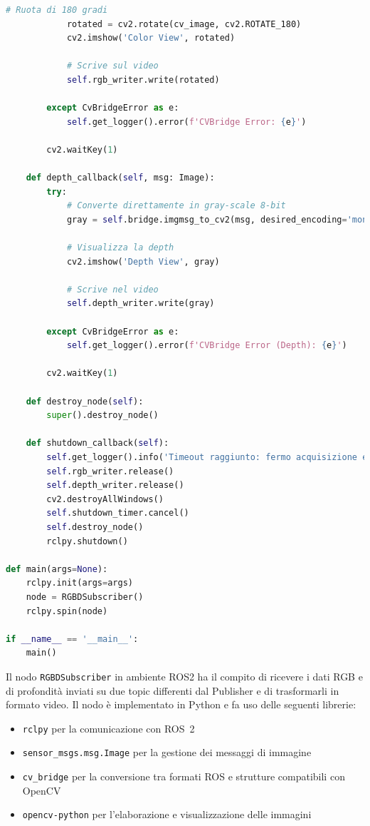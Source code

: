 \documentclass[11pt]{report}
\begin{document}
\begin{lstlisting}[language=Python, caption=Subscriber RGB-D ROS2 con salvataggio video, label=lst:rgbd_subscriber]
            # Ruota di 180 gradi
            rotated = cv2.rotate(cv_image, cv2.ROTATE_180)
            cv2.imshow('Color View', rotated)

            # Scrive sul video
            self.rgb_writer.write(rotated)

        except CvBridgeError as e:
            self.get_logger().error(f'CVBridge Error: {e}')
        
        cv2.waitKey(1)

    def depth_callback(self, msg: Image):
        try:
            # Converte direttamente in gray-scale 8-bit
            gray = self.bridge.imgmsg_to_cv2(msg, desired_encoding='mono8')

            # Visualizza la depth
            cv2.imshow('Depth View', gray)

            # Scrive nel video
            self.depth_writer.write(gray)

        except CvBridgeError as e:
            self.get_logger().error(f'CVBridge Error (Depth): {e}')

        cv2.waitKey(1)

    def destroy_node(self):
        super().destroy_node()

    def shutdown_callback(self):
        self.get_logger().info('Timeout raggiunto: fermo acquisizione e chiudo finestre.')
        self.rgb_writer.release()
        self.depth_writer.release()
        cv2.destroyAllWindows()
        self.shutdown_timer.cancel()
        self.destroy_node()
        rclpy.shutdown()

def main(args=None):
    rclpy.init(args=args)
    node = RGBDSubscriber()
    rclpy.spin(node)

if __name__ == '__main__':
    main()
\end{lstlisting}
\vspace{1em} %
Il nodo \texttt{RGBDSubscriber} in ambiente ROS2 ha il compito di ricevere i dati RGB e di profondità inviati su due topic differenti dal Publisher e di trasformarli in formato video. Il nodo è implementato in Python e fa uso delle seguenti librerie:
\begin{itemize}
  \item \texttt{rclpy} per la comunicazione con ROS~2
  \item \texttt{sensor\_msgs.msg.Image} per la gestione dei messaggi di immagine
  \item \texttt{cv\_bridge} per la conversione tra formati ROS e strutture compatibili con OpenCV
  \item \texttt{opencv-python} per l’elaborazione e visualizzazione delle immagini
\end{itemize}
\end{document}
